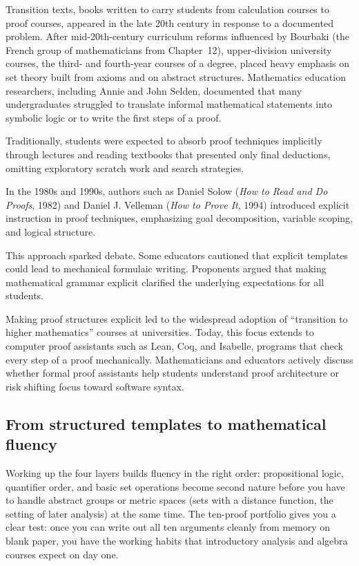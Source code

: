 \begin{historybox}
Transition texts, books written to carry students from calculation courses to proof courses, appeared in the late 20th century in response to a documented problem. After mid-20th-century curriculum reforms influenced by Bourbaki (the French group of mathematicians from Chapter~12), upper-division university courses, the third- and fourth-year courses of a degree, placed heavy emphasis on set theory built from axioms and on abstract structures. Mathematics education researchers, including Annie and John Selden, documented that many undergraduates struggled to translate informal mathematical statements into symbolic logic or to write the first steps of a proof.

Traditionally, students were expected to absorb proof techniques implicitly through lectures and reading textbooks that presented only final deductions, omitting exploratory scratch work and search strategies.

In the 1980s and 1990s, authors such as Daniel Solow (\emph{How to Read and Do Proofs}, 1982) and Daniel J. Velleman (\emph{How to Prove It}, 1994) introduced explicit instruction in proof techniques, emphasizing goal decomposition, variable scoping, and logical structure.

This approach sparked debate. Some educators cautioned that explicit templates could lead to mechanical formulaic writing. Proponents argued that making mathematical grammar explicit clarified the underlying expectations for all students.

Making proof structures explicit led to the widespread adoption of ``transition to higher mathematics'' courses at universities. Today, this focus extends to computer proof assistants such as Lean, Coq, and Isabelle, programs that check every step of a proof mechanically. Mathematicians and educators actively discuss whether formal proof assistants help students understand proof architecture or risk shifting focus toward software syntax.
\end{historybox}

\subsection{From structured templates to mathematical fluency}

Working up the four layers builds fluency in the right order: propositional logic, quantifier order, and basic set operations become second nature before you have to handle abstract groups or metric spaces (sets with a distance function, the setting of later analysis) at the same time. The ten-proof portfolio gives you a clear test: once you can write out all ten arguments cleanly from memory on blank paper, you have the working habits that introductory analysis and algebra courses expect on day one.

